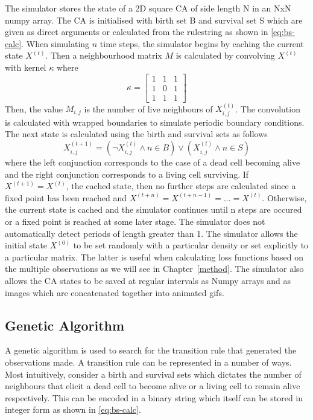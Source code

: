 The simulator stores the state of a 2D square CA of side length N in an NxN numpy array. The CA is initialised with birth set B and survival set S which are given as direct arguments or calculated from the rulestring as shown in \ref{eq:bs-calc}. When simulating $n$ time steps, the simulator begins by caching the current state $X^{(t)}$. Then a neighbourhood matrix $M$ is calculated by convolving $X^{(t)}$ with kernel $\kappa$ where
\[
    \kappa = \begin{bmatrix}
        1 & 1 & 1\\
        1 & 0 & 1\\
        1 & 1 & 1
        \end{bmatrix}    
\]
Then, the value $M_{i,j}$ is the number of live neighbours of $X^{(t)}_{i,j}$. The convolution is calculated with wrapped boundaries to simulate periodic boundary conditions. The next state is calculated using the birth and survival sets as follows
\[
    X^{(t+1)}_{i,j}= (\lnot X^{(t)}_{i,j} \land n \in B) \lor (X^{(t)}_{i,j} \land n \in S)
\]
where the left conjunction corresponds to the case of a dead cell becoming alive and the right conjunction corresponds to a living cell surviving. If $X^{(t+1)} = X^{(t)}$, the cached state, then no further steps are calculated since a fixed point has been reached and $X^{(t + n)} = X^{(t + n - 1)} = ... = X^{(t)}$. Otherwise, the current state is cached and the simulator continues until n steps are occured or a fixed point is reached at some later stage. The simulator does not automatically detect periods of length greater than 1. The simulator allows the initial state $X^{(0)}$ to be set randomly with a particular density or set explicitly to a particular matrix. The latter is useful when calculating loss functions based on the multiple observations as we will see in Chapter~\ref{method}. The simulator also allows the CA states to be saved at regular intervals as Numpy arrays and as images which are concatenated together into animated gifs.\\


\subsection{Genetic Algorithm} \label{subsec:life-like-ga}

A genetic algorithm is used to search for the transition rule that generated the observations made. A transition rule can be represented in a number of ways. Most intuitively, consider a birth and survival sets which dictates the number of neighbours that elicit a dead cell to become alive or a living cell to remain alive respectively. This can be encoded in a binary string which itself can be stored in integer form as shown in \ref{eq:bs-calc}.


